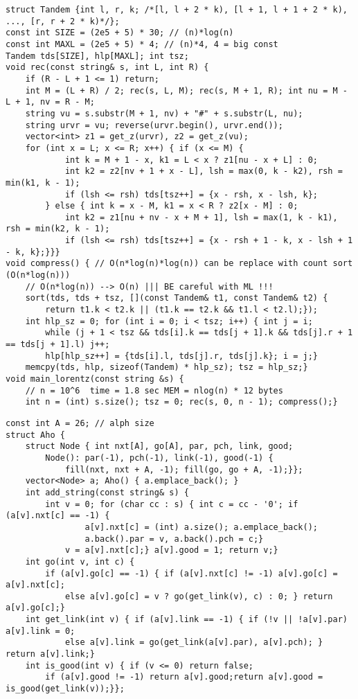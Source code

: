 \documentclass[a4paper,12pt]{article}
\begin{document}
\begin{verbatim}
struct Tandem {int l, r, k; /*[l, l + 2 * k), [l + 1, l + 1 + 2 * k), ..., [r, r + 2 * k)*/};
const int SIZE = (2e5 + 5) * 30; // (n)*log(n)
const int MAXL = (2e5 + 5) * 4; // (n)*4, 4 = big const
Tandem tds[SIZE], hlp[MAXL]; int tsz;
void rec(const string& s, int L, int R) {
    if (R - L + 1 <= 1) return;
    int M = (L + R) / 2; rec(s, L, M); rec(s, M + 1, R); int nu = M - L + 1, nv = R - M;
    string vu = s.substr(M + 1, nv) + "#" + s.substr(L, nu);
    string urvr = vu; reverse(urvr.begin(), urvr.end());
    vector<int> z1 = get_z(urvr), z2 = get_z(vu);
    for (int x = L; x <= R; x++) { if (x <= M) {
            int k = M + 1 - x, k1 = L < x ? z1[nu - x + L] : 0;
            int k2 = z2[nv + 1 + x - L], lsh = max(0, k - k2), rsh = min(k1, k - 1);
            if (lsh <= rsh) tds[tsz++] = {x - rsh, x - lsh, k};
        } else { int k = x - M, k1 = x < R ? z2[x - M] : 0;
            int k2 = z1[nu + nv - x + M + 1], lsh = max(1, k - k1), rsh = min(k2, k - 1);
            if (lsh <= rsh) tds[tsz++] = {x - rsh + 1 - k, x - lsh + 1 - k, k};}}}
void compress() { // O(n*log(n)*log(n)) can be replace with count sort (O(n*log(n)))
    // O(n*log(n)) --> O(n) ||| BE careful with ML !!!
    sort(tds, tds + tsz, [](const Tandem& t1, const Tandem& t2) {
        return t1.k < t2.k || (t1.k == t2.k && t1.l < t2.l);});
    int hlp_sz = 0; for (int i = 0; i < tsz; i++) { int j = i; 
        while (j + 1 < tsz && tds[i].k == tds[j + 1].k && tds[j].r + 1 == tds[j + 1].l) j++;
        hlp[hlp_sz++] = {tds[i].l, tds[j].r, tds[j].k}; i = j;}
    memcpy(tds, hlp, sizeof(Tandem) * hlp_sz); tsz = hlp_sz;}
void main_lorentz(const string &s) {
    // n = 10^6  time = 1.8 sec MEM = nlog(n) * 12 bytes
    int n = (int) s.size(); tsz = 0; rec(s, 0, n - 1); compress();}
\end{verbatim}


\begin{verbatim}
const int A = 26; // alph size
struct Aho {
    struct Node { int nxt[A], go[A], par, pch, link, good;
        Node(): par(-1), pch(-1), link(-1), good(-1) {
            fill(nxt, nxt + A, -1); fill(go, go + A, -1);}};
    vector<Node> a; Aho() { a.emplace_back(); }
    int add_string(const string& s) {
        int v = 0; for (char cc : s) { int c = cc - '0'; if (a[v].nxt[c] == -1) {
                a[v].nxt[c] = (int) a.size(); a.emplace_back();
                a.back().par = v, a.back().pch = c;}
            v = a[v].nxt[c];} a[v].good = 1; return v;}
    int go(int v, int c) {
        if (a[v].go[c] == -1) { if (a[v].nxt[c] != -1) a[v].go[c] = a[v].nxt[c];
            else a[v].go[c] = v ? go(get_link(v), c) : 0; } return a[v].go[c];}
    int get_link(int v) { if (a[v].link == -1) { if (!v || !a[v].par) a[v].link = 0;
            else a[v].link = go(get_link(a[v].par), a[v].pch); } return a[v].link;}
    int is_good(int v) { if (v <= 0) return false;
        if (a[v].good != -1) return a[v].good;return a[v].good = is_good(get_link(v));}};
\end{verbatim}
\end{document}
